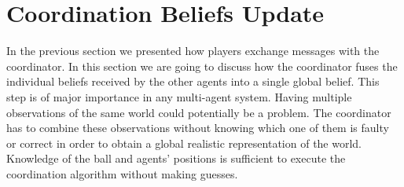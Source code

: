 \section{Coordination Beliefs Update}

In the previous section we presented how players exchange messages with the coordinator. In this section we are going to discuss how the coordinator fuses the individual beliefs received by the other agents into a single global belief. This step is of major importance in any multi-agent system. Having multiple observations of the same world could potentially be a problem. The coordinator has to combine these observations without knowing which one of them is faulty or correct in order to obtain a global realistic representation of the world. Knowledge of the ball and agents' positions is sufficient to execute the coordination algorithm without making guesses.

